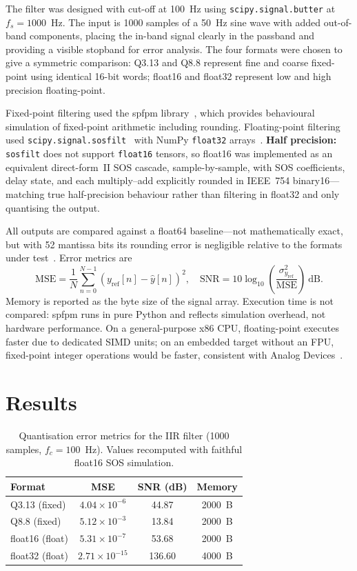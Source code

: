 \documentclass[conference]{IEEEtran}
\begin{document}
The filter was designed with cut-off at 100~Hz using \texttt{scipy.signal.butter} at $f_s=1000$~Hz. The input is 1000 samples of a 50~Hz sine wave with added out-of-band components, placing the in-band signal clearly in the passband and providing a visible stopband for error analysis. The four formats were chosen to give a symmetric comparison: Q3.13 and Q8.8 represent fine and coarse fixed-point using identical 16-bit words; float16 and float32 represent low and high precision floating-point.

Fixed-point filtering used the spfpm library~\cite{spfpm}, which provides behavioural simulation of fixed-point arithmetic including rounding. Floating-point filtering used \texttt{scipy.signal.sosfilt}~\cite{scipy2020} with NumPy \texttt{float32} arrays~\cite{harris2020}. \textbf{Half precision:} \texttt{sosfilt} does not support \texttt{float16} tensors, so float16 was implemented as an equivalent direct-form~II SOS cascade, sample-by-sample, with SOS coefficients, delay state, and each multiply--add explicitly rounded in IEEE~754 binary16---matching true half-precision behaviour rather than filtering in float32 and only quantising the output.

All outputs are compared against a float64 baseline---not mathematically exact, but with 52 mantissa bits its rounding error is negligible relative to the formats under test~\cite{ieee754}. Error metrics are
\begin{equation}
\mathrm{MSE} = \frac{1}{N}\sum_{n=0}^{N-1}(y_{\mathrm{ref}}[n]-\hat{y}[n])^2,\quad
\mathrm{SNR} = 10\log_{10}\!\left(\frac{\sigma^2_{y_{\mathrm{ref}}}}{\mathrm{MSE}}\right)\ \mathrm{dB}.
\label{eq:metrics}
\end{equation}
Memory is reported as the byte size of the signal array. Execution time is not compared: spfpm runs in pure Python and reflects simulation overhead, not hardware performance. On a general-purpose x86 CPU, floating-point executes faster due to dedicated SIMD units; on an embedded target without an FPU, fixed-point integer operations would be faster, consistent with Analog Devices~\cite{analog2007}.

\section{Results}

\begin{table}[htbp]
\caption{Quantisation error metrics for the IIR filter (1000 samples, $f_c=100$~Hz). Values recomputed with faithful float16 SOS simulation.}
\label{tab:metrics}
\centering
\begin{tabular}{@{}lccc@{}}
\toprule
Format & MSE & SNR (dB) & Memory \\
\midrule
Q3.13 (fixed) & $4.04\times 10^{-6}$ & 44.87 & 2000~B \\
Q8.8 (fixed) & $5.12\times 10^{-3}$ & 13.84 & 2000~B \\
float16 (float) & $5.31\times 10^{-7}$ & 53.68 & 2000~B \\
float32 (float) & $2.71\times 10^{-15}$ & 136.60 & 4000~B \\
\bottomrule
\end{tabular}
\end{table}
\end{document}
